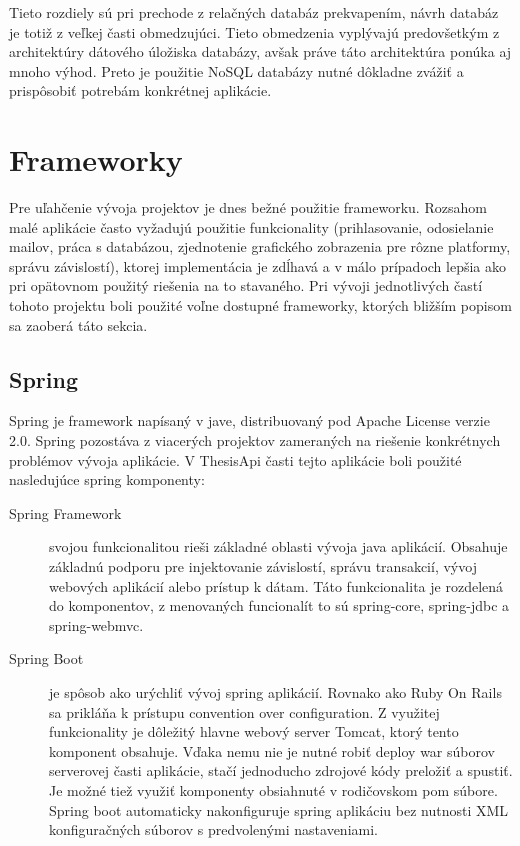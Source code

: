 	Tieto rozdiely sú pri prechode z relačných databáz prekvapením, návrh databáz je totiž z veľkej časti obmedzujúci. Tieto obmedzenia vyplývajú predovšetkým z architektúry dátového úložiska databázy, avšak práve táto architektúra ponúka aj mnoho výhod. Preto je použitie NoSQL databázy nutné dôkladne zvážiť a prispôsobiť potrebám konkrétnej aplikácie.
	
\section{Frameworky}
	Pre uľahčenie vývoja projektov je dnes bežné použitie frameworku. Rozsahom malé aplikácie často vyžadujú použitie funkcionality (prihlasovanie, odosielanie mailov, práca s databázou, zjednotenie grafického zobrazenia pre rôzne platformy, správu závislostí), ktorej implementácia je zdĺhavá a v málo prípadoch lepšia ako pri opätovnom použitý riešenia na to stavaného. Pri vývoji jednotlivých častí tohoto projektu boli použité voľne dostupné frameworky, ktorých bližším popisom sa zaoberá táto sekcia.

	\subsection{Spring}
	Spring je framework napísaný v jave, distribuovaný pod Apache License verzie 2.0. Spring pozostáva z viacerých projektov zameraných na riešenie konkrétnych problémov vývoja aplikácie. V ThesisApi časti tejto aplikácie boli použité nasledujúce spring komponenty:
	\begin{description}
		\item[Spring Framework] svojou funkcionalitou rieši základné oblasti vývoja java aplikácií. Obsahuje základnú podporu pre injektovanie závislostí, správu transakcií, vývoj webových aplikácií alebo prístup k dátam. Táto funkcionalita je rozdelená do komponentov, z menovaných funcionalít to sú spring-core, spring-jdbc a spring-webmvc.
		
		\item[Spring Boot] je spôsob ako urýchliť vývoj spring aplikácií. Rovnako ako Ruby On Rails sa prikláňa k prístupu convention over configuration. Z využitej funkcionality je dôležitý hlavne webový server Tomcat, ktorý tento komponent obsahuje. Vďaka nemu nie je nutné robiť deploy war súborov serverovej časti aplikácie, stačí jednoducho zdrojové kódy preložiť a spustiť. Je možné tiež využiť komponenty obsiahnuté v rodičovskom pom súbore. Spring boot automaticky nakonfiguruje spring aplikáciu bez nutnosti XML konfiguračných súborov s predvolenými nastaveniami.
	\end{description}
		
